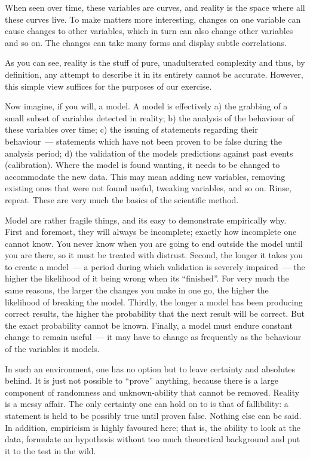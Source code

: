 \documentclass{memoir}
\begin{document}
When seen over time, these variables are curves, and reality is the
space where all these curves live. To make matters more interesting,
changes on one variable can cause changes to other variables, which in
turn can also change other variables and so on. The changes can take
many forms and display subtle correlations.

As you can see, reality is the stuff of pure, unadulterated complexity
and thus, by definition, any attempt to describe it in its entirety
cannot be accurate. However, this simple view suffices for the
purposes of our exercise.

Now imagine, if you will, a model. A model is effectively a) the
grabbing of a small subset of variables detected in reality; b) the
analysis of the behaviour of these variables over time; c) the issuing
of statements regarding their behaviour~--- statements which have not
been proven to be false during the analysis period; d) the validation
of the models predictions against past events (calibration). Where the
model is found wanting, it needs to be changed to accommodate the new
data. This may mean adding new variables, removing existing ones that
were not found useful, tweaking variables, and so on. Rinse,
repeat. These are very much the basics of the scientific method.

Model are rather fragile things, and its easy to demonstrate
empirically why. First and foremost, they will always be incomplete;
exactly how incomplete one cannot know. You never know when you are
going to end outside the model until you are there, so it must be
treated with distrust. Second, the longer it takes you to create a
model~--- a period during which validation is severely impaired~---
the higher the likelihood of it being wrong when its ``finished''. For
very much the same reasons, the larger the changes you make in one go,
the higher the likelihood of breaking the model. Thirdly, the longer a
model has been producing correct results, the higher the probability
that the next result will be correct. But the exact probability cannot
be known. Finally, a model must endure constant change to remain
useful~--- it may have to change as frequently as the behaviour of the
variables it models.

In such an environment, one has no option but to leave certainty and
absolutes behind. It is just not possible to ``prove'' anything, because
there is a large component of randomness and unknown-ability that
cannot be removed. Reality is a messy affair. The only certainty one
can hold on to is that of fallibility: a statement is held to be
possibly true until proven false. Nothing else can be said. In
addition, empiricism is highly favoured here; that is, the ability to
look at the data, formulate an hypothesis without too much theoretical
background and put it to the test in the wild.
\end{document}

